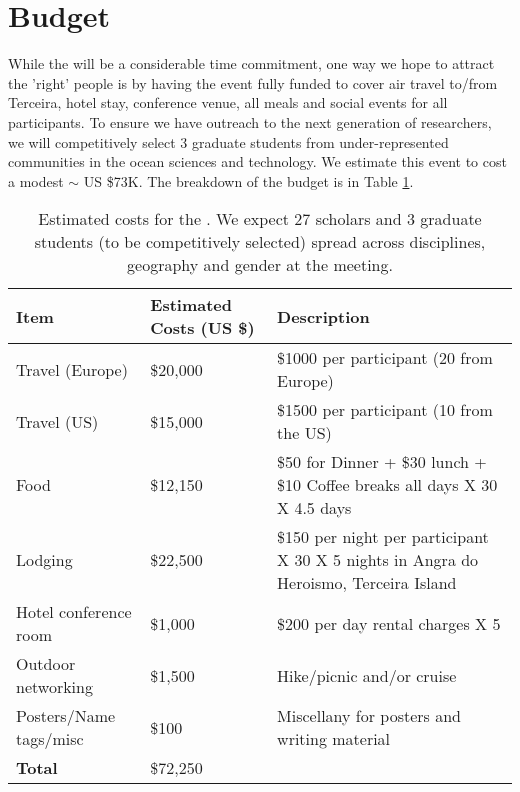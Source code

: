 \section{Budget}
\label{sec:budget}

While the \symp will be a considerable time commitment, one way we
hope to attract the 'right' people is by having the event fully funded
to cover air travel to/from Terceira, hotel stay, conference venue,
all meals and social events for all participants. To ensure we have
outreach to the next generation of researchers, we will competitively
select 3 graduate students from under-represented communities in the
ocean sciences and technology. We estimate this event to cost a modest
$\sim$ US \$73K. The breakdown of the budget is in Table
\ref{tab:budget}.

\begin{table}[!h]
  \footnotesize{
    \centering    
    \begin{tabular}{|p{3.5cm}|p{1.6cm}|p{10cm}|}
    \hline 
    \rowcolor{Gray}
    \bfseries Item& \bfseries Estimated Costs (US \$)&\bfseries Description\\
    \hline
      Travel (Europe)& \$20,000 & \$1000 per participant (20 from Europe) \\
    \hline
      Travel (US)& \$15,000 & \$1500 per participant (10 from the US) \\
    \hline
      Food& \$12,150 & \$50 for Dinner + \$30 lunch + \$10 Coffee
                       breaks all days X 30 X 4.5 days\\
    \hline
      Lodging& \$22,500 & \$150 per night per participant X 30 X 5 nights in Angra do Heroismo, Terceira Island\\
    \hline
      Hotel conference room &\$1,000 & \$200 per day rental charges X 5\\
    \hline
      Outdoor networking& \$1,500 & Hike/picnic and/or cruise\\
    \hline
      Posters/Name tags/misc& \$100 & Miscellany for posters and writing material\\
    \hline
    \textbf{Total}& \$72,250 &\\
    \hline        
  \end{tabular}
  \caption{Estimated costs for the \sympe. We expect 27 scholars and 3
    graduate students (to be competitively selected) spread across
    disciplines, geography and gender at the
    meeting.}
  \label{tab:budget}
}
\end{table}


